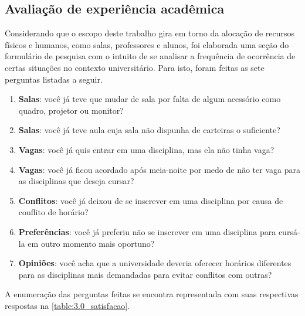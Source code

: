 \begin{apendicesenv}
  \section*{Avaliação de experiência acadêmica} \label{sec:Avaliação de experiência acadêmica}

  Considerando que o escopo deste trabalho gira em torno da alocação de recursos físicos e humanos, como salas, professores e alunos, foi elaborada uma seção do formulário de pesquisa com o intuito de se analisar a frequência de ocorrência de certas situações no contexto universitário. Para isto, foram feitas as sete perguntas listadas a seguir.

  \begin{enumerate}
    \item \textbf{Salas}: você já teve que mudar de sala por falta de algum acessório como quadro, projetor ou monitor? %
    \item \textbf{Salas}: você já teve aula cuja sala não dispunha de carteiras o suficiente? %
    \item \textbf{Vagas}: você já quis entrar em uma disciplina, mas ela não tinha vaga? %
    \item \textbf{Vagas}: você já ficou acordado após meia-noite por medo de não ter vaga para as disciplinas que deseja cursar? %
    \item \textbf{Conflitos}: você já deixou de se inscrever em uma disciplina por causa de conflito de horário? %
    \item \textbf{Preferências}: você já preferiu não se inscrever em uma disciplina para cursá-la em outro momento mais oportuno? %
    \item \textbf{Opiniões}: você acha que a universidade deveria oferecer horários diferentes para as disciplinas mais demandadas para evitar conflitos com outras? %
  \end{enumerate}

  A enumeração das perguntas feitas se encontra representada com suas respectivas respostas na \autoref{table:3.0_satisfacao}.


\end{apendicesenv}
